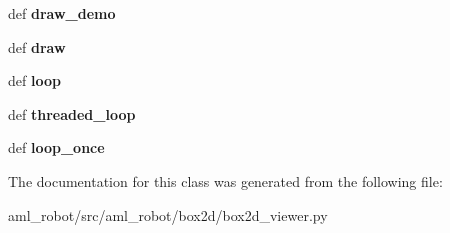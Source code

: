 \begin{DoxyCompactItemize}
\item 
\hypertarget{classaml__robot_1_1box2d_1_1box2d__viewer_1_1_box2_d_viewer_a40cd429d0d92a2e67cc790a06272693f}{def {\bfseries draw\-\_\-demo}}\label{classaml__robot_1_1box2d_1_1box2d__viewer_1_1_box2_d_viewer_a40cd429d0d92a2e67cc790a06272693f}

\item 
\hypertarget{classaml__robot_1_1box2d_1_1box2d__viewer_1_1_box2_d_viewer_add504a568a395240cf8e6f18c4ef4520}{def {\bfseries draw}}\label{classaml__robot_1_1box2d_1_1box2d__viewer_1_1_box2_d_viewer_add504a568a395240cf8e6f18c4ef4520}

\item 
\hypertarget{classaml__robot_1_1box2d_1_1box2d__viewer_1_1_box2_d_viewer_a665d3182d153a00c85aef23c58d4cf0c}{def {\bfseries loop}}\label{classaml__robot_1_1box2d_1_1box2d__viewer_1_1_box2_d_viewer_a665d3182d153a00c85aef23c58d4cf0c}

\item 
\hypertarget{classaml__robot_1_1box2d_1_1box2d__viewer_1_1_box2_d_viewer_a809a1126de09903bb24e349fe09d8bc8}{def {\bfseries threaded\-\_\-loop}}\label{classaml__robot_1_1box2d_1_1box2d__viewer_1_1_box2_d_viewer_a809a1126de09903bb24e349fe09d8bc8}

\item 
\hypertarget{classaml__robot_1_1box2d_1_1box2d__viewer_1_1_box2_d_viewer_aac4559433a5a3af674e836ae73128498}{def {\bfseries loop\-\_\-once}}\label{classaml__robot_1_1box2d_1_1box2d__viewer_1_1_box2_d_viewer_aac4559433a5a3af674e836ae73128498}

\end{DoxyCompactItemize}


The documentation for this class was generated from the following file\-:\begin{DoxyCompactItemize}
\item 
aml\-\_\-robot/src/aml\-\_\-robot/box2d/box2d\-\_\-viewer.\-py\end{DoxyCompactItemize}
